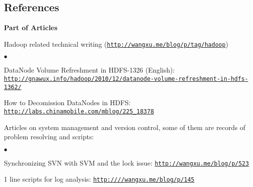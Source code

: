 \documentclass[a4paper,margin,line]{res}
\newenvironment{list1}{
  \begin{list}{\ding{113}}{%
      \setlength{\itemsep}{0in}
      \setlength{\parsep}{0in} \setlength{\parskip}{0in}
      \setlength{\topsep}{0in} \setlength{\partopsep}{0in} 
      \setlength{\leftmargin}{0.17in}}}{\end{list}}
\newenvironment{list2}{
  \begin{list}{$\bullet$}{%
      \setlength{\itemsep}{0in}
      \setlength{\parsep}{0in} \setlength{\parskip}{0in}
      \setlength{\topsep}{0in} \setlength{\partopsep}{0in} 
      \setlength{\leftmargin}{0.2in}}}{\end{list}}
\newcommand{\http}{http:/\hspace{-0.3ex}/}
\newcommand{\hindent}{\mbox{\hspace{8ex}}}
\begin{document}
\begin{resume}
\section{\sc References}
\textbf{Part of Articles}\\
\vspace*{-.1in}
\begin{list1}
\item[] Hadoop related technical writing (\href{http://wangxu.me/blog/p/tag/hadoop}{\tt\http{}wangxu.me/blog/p/tag/hadoop})
\begin{list2}
\vspace*{.05in}
\item DataNode Volume Refreshment in HDFS-1326 (English):\\ 
    \hindent\href{http://gnawux.info/hadoop/2010/12/datanode-volume-refreshment-in-hdfs-1362/}{\tt\http{}gnawux.info/hadoop/2010/12/datanode-volume-refreshment-in-hdfs-1362/}
\item How to Decomission DataNodes in HDFS: \href{http://labs.chinamobile.com/mblog/225_18378}{\tt\http{}labs.chinamobile.com/mblog/225\_18378}
\vspace*{.05in}
\end{list2}
\item[] Articles on system management and version control, some of them are records of problem resolving and scripts:
\begin{list2}
\vspace*{.05in}
\item Synchronizing SVN with SVM and the lock issue: \href{http://wangxu.me/blog/p/523}{\tt\http{}wangxu.me/blog/p/523}
\item 1 line scripts for log analysis: \href{http://wangxu.me/blog/p/145}{\tt\http{}//wangxu.me/blog/p/145}
\vspace*{.05in}
\end{list2}
\end{list1}


\end{resume}
\end{document}
